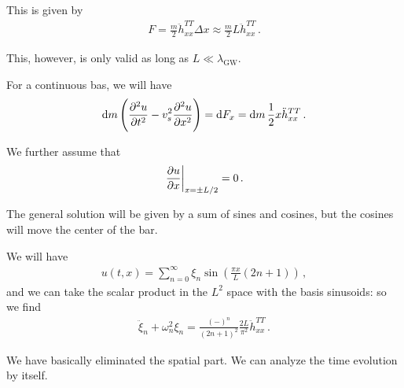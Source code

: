 \documentclass[main.tex]{subfiles}
\begin{document}
This is given by 
%
\begin{align}
F = \frac{m}{2} \ddot{h}^{TT}_{xx} \Delta x \approx \frac{m}{2} L \ddot{h}^{TT}_{xx}
\,.
\end{align}

This, however, is only valid as long as \(L \ll \lambda _{\text{GW}}\). 

For a continuous bas, we will have 
%
\begin{align}
\dd{m} \qty(\pdv[2]{u}{t} - v_s^2 \pdv[2]{u}{x}) = \dd{F_x} = \dd{m} \frac{1}{2} x \ddot{h}_{xx}^{TT}
\,.
\end{align}
%

We further assume that 
%
\begin{align}
\eval{\pdv{u}{x}}_{x = \pm L/2} = 0
\,.
\end{align}

The general solution will be given by a sum of sines and cosines, but the cosines will move the center of the bar. 

We will have 
%
\begin{align}
u(t, x) = \sum _{n=0}^{ \infty } \xi_{n} \sin( \frac{\pi x}{L} (2 n + 1))
\,,
\end{align}
%
and we can take the scalar product in the \(L^{2}\) space with the basis sinusoids: so we find 
%
\begin{align}
\ddot{\xi}_{n} + \omega^2_{n} \xi_{n} = \frac{(-)^{n}}{(2n+1)^2} \frac{2L}{\pi^2} \ddot{h}^{TT}_{xx}
\,.
\end{align}

We have basically eliminated the spatial part. 
We can analyze the time evolution by itself. 
\end{document}

